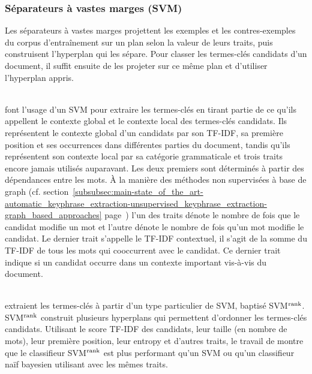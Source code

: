       \subsubsection{Séparateurs à vastes marges (SVM)}
      \label{subsubsec:main-state_of_the_art-automatic_keyphrase_extraction-supervised_keyphrase_extraction-svms}
        Les séparateurs à vastes marges projettent les exemples et les
        contres-exemples du corpus d'entraînement sur un plan selon la valeur de
        leurs traits, puis construisent l'hyperplan qui les sépare. Pour classer
        les termes-clés candidats d'un document, il suffit ensuite de les
        projeter sur ce même plan et d'utiliser l'hyperplan appris.

        ~\\ font l'usage d'un SVM pour extraire les
        termes-clés en tirant partie de ce qu'ils appellent le contexte global
        et le contexte local des termes-clés candidats. Ils représentent le
        contexte global d'un candidats par son TF-IDF, sa première position et
        ses occurrences dans différentes parties du document, tandis qu'ils
        représentent son contexte local par sa catégorie grammaticale et trois
        traits encore jamais utilisés auparavant. Les deux premiers sont
        déterminés à partir des dépendances entre les mots. À la manière des
        méthodes non supervisées à base de graph (cf.
        section~\ref{subsubsec:main-state_of_the_art-automatic_keyphrase_extraction-unsupervised_keyphrase_extraction-graph_based_approaches}
        page~\pageref{subsubsec:main-state_of_the_art-automatic_keyphrase_extraction-unsupervised_keyphrase_extraction-graph_based_approaches})
        l'un des traits dénote le nombre de fois que le candidat modifie un mot
        et l'autre dénote le nombre de fois qu'un mot modifie le candidat. Le
        dernier trait s'appelle le TF-IDF contextuel, il s'agit de la somme du
        TF-IDF de tous les mots qui cooccurrent avec le candidat. Ce dernier
        trait indique si un candidat occurre dans un contexte important
        vis-à-vis du document.

        ~\\ extraient les termes-clés à partir d'un
        type particulier de SVM, baptisé SVM$^\textnormal{rank}$.
        SVM$^\textnormal{rank}$ construit plusieurs hyperplans qui permettent
        d'ordonner les termes-clés candidats. Utilisant le score TF-IDF des
        candidats, leur taille (en nombre de mots), leur première position, leur
        entropy et d'autres traits, le travail de
         montre que le classifieur
        SVM$^\textnormal{rank}$ est plus performant qu'un SVM ou qu'un
        classifieur naïf bayesien utilisant avec les mêmes traits.

